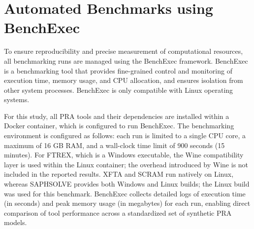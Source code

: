 \section{Automated Benchmarks using BenchExec}
\label{sec:benchexec}

To ensure reproducibility and precise measurement of computational resources, all benchmarking runs are managed using the BenchExec framework. BenchExec is a benchmarking tool that provides fine-grained control and monitoring of execution time, memory usage, and CPU allocation, and ensures isolation from other system processes. BenchExec is only compatible with Linux operating systems.

For this study, all PRA tools and their dependencies are installed within a Docker container, which is configured to run BenchExec. The benchmarking environment is configured as follows: each run is limited to a single CPU core, a maximum of 16 GB RAM, and a wall-clock time limit of 900 seconds (15 minutes). For FTREX, which is a Windows executable, the Wine compatibility layer is used within the Linux container; the overhead introduced by Wine is not included in the reported results. XFTA and SCRAM run natively on Linux, whereas SAPHSOLVE provides both Windows and Linux builds; the Linux build was used for this benchmark. BenchExec collects detailed logs of execution time (in seconds) and peak memory usage (in megabytes) for each run, enabling direct comparison of tool performance across a standardized set of synthetic PRA models.
